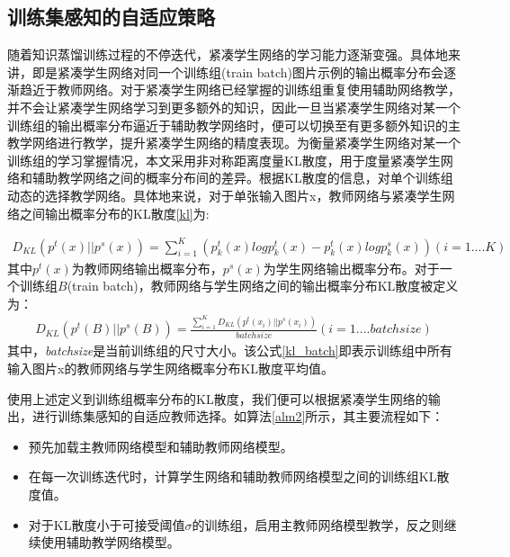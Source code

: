 \subsection{训练集感知的自适应策略}
随着知识蒸馏训练过程的不停迭代，紧凑学生网络的学习能力逐渐变强。具体地来讲，即是紧凑学生网络对同一个训练组(train batch)图片示例的输出概率分布会逐渐趋近于教师网络。对于紧凑学生网络已经掌握的训练组重复使用辅助网络教学，并不会让紧凑学生网络学习到更多额外的知识，因此一旦当紧凑学生网络对某一个训练组的输出概率分布逼近于辅助教学网络时，便可以切换至有更多额外知识的主教学网络进行教学，提升紧凑学生网络的精度表现。为衡量紧凑学生网络对某一个训练组的学习掌握情况，本文采用非对称距离度量KL散度，用于度量紧凑学生网络和辅助教学网络之间的概率分布间的差异。根据KL散度的信息，对单个训练组动态的选择教学网络。具体地来说，对于单张输入图片x，教师网络与紧凑学生网络之间输出概率分布的KL散度\ref{kl}为:

\begin{equation}
\begin{aligned}
\label{kl}
D_{KL}(p^{t}(x)||p^{s}(x))=\sum_{i=1}^{K}(p^{t}_{k}(x)logp^{t}_{k}(x) - p^{t}_{k}(x)logp^{s}_{k}(x)) (i=1....K)
\end{aligned}
\end{equation}
其中$p^{t}(x)$为教师网络输出概率分布，$p^{s}(x)$为学生网络输出概率分布。对于一个训练组$B$(train batch)，教师网络与学生网络之间的输出概率分布KL散度被定义为：
\begin{equation}
\begin{aligned}
\label{kl_batch}
D_{KL}(p^{t}(B)||p^{s}(B))= \frac{\sum_{i=1}^{K}D_{KL}(p^{t}(x_i)||p^{s}(x_i))}{batchsize} (i=1....batchsize)
\end{aligned}
\end{equation}
其中，\emph{batchsize}是当前训练组的尺寸大小。该公式\ref{kl_batch}即表示训练组中所有输入图片x的教师网络与学生网络概率分布KL散度平均值。

使用上述定义到训练组概率分布的KL散度，我们便可以根据紧凑学生网络的输出，进行训练集感知的自适应教师选择。如算法\ref{alm2}所示，其主要流程如下：
\begin{itemize}
	\item 预先加载主教师网络模型和辅助教师网络模型。 
	\item 在每一次训练迭代时，计算学生网络和辅助教师网络模型之间的训练组KL散度值。
	\item 对于KL散度小于可接受阈值$\sigma$的训练组，启用主教师网络模型教学，反之则继续使用辅助教学网络模型。
\end{itemize}

